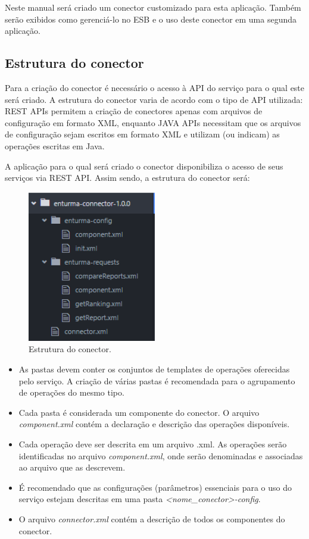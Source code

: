 Neste manual será criado um conector customizado para esta aplicação. Também serão exibidos como gerenciá-lo no ESB e o uso deste conector em uma segunda aplicação.

\subsection{Estrutura do conector}

Para a criação do conector é necessário o acesso à API do serviço para o qual este será criado. A estrutura do conector varia de acordo com o tipo de API utilizada: REST APIs permitem a criação de conectores apenas com arquivos de configuração em formato XML, enquanto JAVA APIs necessitam que os arquivos de configuração sejam escritos em formato XML e utilizam (ou indicam) as operações escritas em Java.

A aplicação para o qual será criado o conector disponibiliza o acesso de seus serviços via REST API. Assim sendo, a estrutura do conector será:

\begin{figure}[htb]
\centering
\includegraphics[width=0.5\textwidth]{figuras/estrutura_conector.PNG}
\caption{Estrutura do conector.}
\label{estrutura_conector}
\end{figure}

\begin{itemize}
\item As pastas devem conter os conjuntos de templates de operações oferecidas pelo serviço. A criação de várias pastas é recomendada para o agrupamento de operações do mesmo tipo.
\item Cada pasta é considerada um componente do conector. O arquivo \textit{component.xml} contém a declaração e descrição das operações disponíveis.
\item Cada operação deve ser descrita em um arquivo .xml. As operações serão identificadas no arquivo \textit{component.xml}, onde serão denominadas e associadas ao arquivo que as descrevem.
\item É recomendado que as configurações (parâmetros) essenciais para o uso do serviço estejam descritas em uma pasta \textit{<nome\_conector>-config}.
\item O arquivo \textit{connector.xml} contém a descrição de todos os componentes do conector.
\end{itemize}

